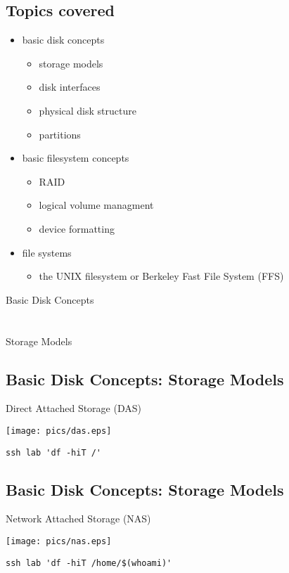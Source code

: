\documentclass[xga]{xdvislides}
\begin{document}
\subsection{Topics covered}
\begin{itemize}
	\item basic disk concepts
		\begin{itemize}
			\item storage models
			\item disk interfaces
			\item physical disk structure
			\item partitions
		\end{itemize}
	\item basic filesystem concepts
		\begin{itemize}
			\item RAID
			\item logical volume managment
			\item device formatting
		\end{itemize}
	\item file systems
		\begin{itemize}
			\item the UNIX filesystem or Berkeley Fast File System (FFS)
		\end{itemize}
\end{itemize}

\newpage
\vspace*{\fill}
\begin{center}
	\Hugesize
		Basic Disk Concepts \\ [1em]
	\hspace*{5mm}
	\blueline\\
	\hspace*{5mm}\\
		Storage Models
\end{center}
\vspace*{\fill}

\subsection{Basic Disk Concepts: Storage Models}
Direct Attached Storage (DAS)
\vfill
\begin{center}
	\texttt{[image: pics/das.eps]} \\
\end{center}
\verb+ssh lab 'df -hiT /'+
\vfill

\subsection{Basic Disk Concepts: Storage Models}
Network Attached Storage (NAS)
\vfill
\begin{center}
	\texttt{[image: pics/nas.eps]} \\
\end{center}
\verb+ssh lab 'df -hiT /home/$(whoami)'+
\vfill
\end{document}
